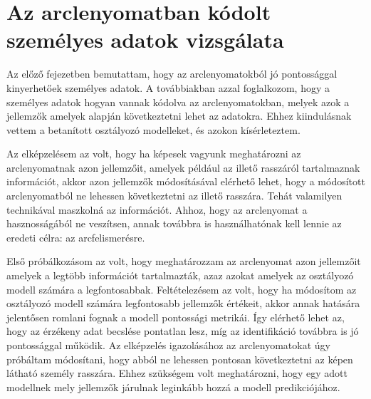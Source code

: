 \section{Az arclenyomatban kódolt személyes adatok vizsgálata} %
\label{sec:5}


Az előző fejezetben bemutattam, hogy az arclenyomatokból jó pontossággal kinyerhetőek személyes adatok. A továbbiakban azzal foglalkozom, hogy a személyes adatok hogyan vannak kódolva az arclenyomatokban, melyek azok a jellemzők amelyek alapján következtetni lehet az adatokra. Ehhez kiindulásnak vettem a betanított osztályozó modelleket, és azokon kísérleteztem.

Az elképzelésem az volt, hogy ha képesek vagyunk meghatározni az arclenyomatnak azon jellemzőit, amelyek például az illető rasszáról tartalmaznak információt, akkor azon jellemzők módosításával elérhető lehet, hogy a módosított arclenyomatból ne lehessen következtetni az illető rasszára. Tehát valamilyen technikával maszkolná az információt. Ahhoz, hogy az arclenyomat a hasznosságából ne veszítsen, annak továbbra is használhatónak kell lennie az eredeti célra: az arcfelismerésre.

Első próbálkozásom az volt, hogy meghatározzam az arclenyomat azon jellemzőit amelyek a legtöbb információt tartalmazták, azaz azokat amelyek az osztályozó modell számára a legfontosabbak. Feltételezésem az volt, hogy ha módosítom az osztályozó modell számára legfontosabb jellemzők értékeit, akkor annak hatására jelentősen romlani fognak a modell pontossági metrikái. Így elérhető lehet az, hogy az érzékeny adat becslése pontatlan lesz, míg az identifikáció továbbra is jó pontossággal működik. Az elképzelés igazolásához az arclenyomatokat úgy próbáltam módosítani, hogy abból ne lehessen pontosan következtetni az képen látható személy rasszára. Ehhez szükségem volt meghatározni, hogy egy adott modellnek mely jellemzők járulnak leginkább hozzá a modell predikciójához.

